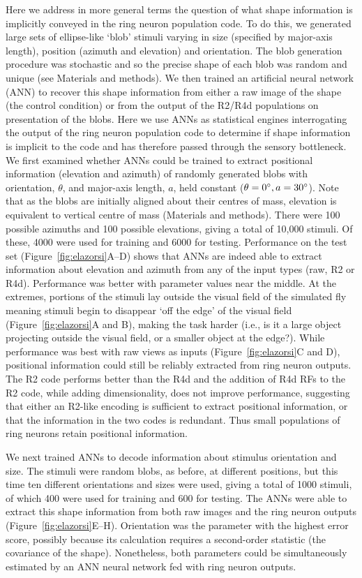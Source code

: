 Here we address in more general terms the question of what shape information is implicitly conveyed in the ring neuron population code. To do this, we generated large sets of ellipse-like ‘blob’ stimuli varying in size (specified by major-axis length), position (azimuth and elevation) and orientation. The blob generation procedure was stochastic and so the precise shape of each blob was random and unique (see Materials and methods). We then trained an artificial neural network (ANN) to recover this shape information from either a raw image of the shape (the control condition) or from the output of the R2/R4d populations on presentation of the blobs. Here we use ANNs as statistical engines interrogating the output of the ring neuron population code to determine if shape information is implicit to the code and has therefore passed through the sensory bottleneck. We first examined whether ANNs could be trained to extract positional information (elevation and azimuth) of randomly generated blobs with orientation, $\theta$, and major-axis length, $a$, held constant ($\theta=0\degree, a = 30\degree$). Note that as the blobs are initially aligned about their centres of mass, elevation is equivalent to vertical centre of mass (Materials and methods). There were 100 possible azimuths and 100 possible elevations, giving a total of 10,000 stimuli. Of these, 4000 were used for training and 6000 for testing. Performance on the test set (Figure~\ref{fig:elazorsi}A--D) shows that ANNs are indeed able to extract information about elevation and azimuth from any of the input types (raw, R2 or R4d). Performance was better with parameter values near the middle. At the extremes, portions of the stimuli lay outside the visual field of the simulated fly meaning stimuli begin to disappear ‘off the edge’ of the visual field (Figure~\ref{fig:elazorsi}A and B), making the task harder (i.e., is it a large object projecting outside the visual field, or a smaller object at the edge?). While performance was best with raw views as inputs (Figure~\ref{fig:elazorsi}C and D), positional information could still be reliably extracted from ring neuron outputs. The R2 code performs better than the R4d and the addition of R4d RFs to the R2 code, while adding dimensionality, does not improve performance, suggesting that either an R2-like encoding is sufficient to extract positional information, or that the information in the two codes is redundant. Thus small populations of ring neurons retain positional information.

We next trained ANNs to decode information about stimulus orientation and size. The stimuli were random blobs, as before, at different positions, but this time ten different orientations and sizes were used, giving a total of 1000 stimuli, of which 400 were used for training and 600 for testing. The ANNs were able to extract this shape information from both raw images and the ring neuron outputs (Figure~\ref{fig:elazorsi}E--H). Orientation was the parameter with the highest error score, possibly because its calculation requires a second-order statistic (the covariance of the shape). Nonetheless, both parameters could be simultaneously estimated by an ANN neural network fed with ring neuron outputs.

